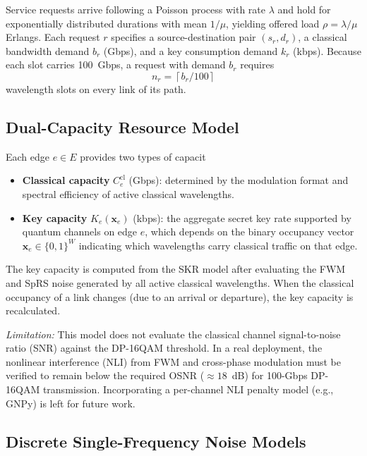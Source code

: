 \documentclass[conference]{IEEEtran}
\begin{document}
Service requests arrive following a Poisson process with rate $\lambda$ and hold for exponentially distributed durations with mean $1/\mu$, yielding offered load $\rho = \lambda / \mu$ Erlangs. Each request $r$ specifies a source-destination pair $(s_r, d_r)$, a classical bandwidth demand $b_r$ (Gbps), and a key consumption demand $k_r$ (kbps). Because each slot carries 100~Gbps, a request with demand $b_r$ requires
\begin{equation}
n_r = \left\lceil b_r / 100 \right\rceil
\label{eq:nslots}
\end{equation}
wavelength slots on every link of its path.

\subsection{Dual-Capacity Resource Model}

Each edge $e \in E$ provides two types of capacit\begin{itemize}
    \item \textbf{Classical capacity} $C_e^{\text{cl}}$ (Gbps): determined by the modulation format and spectral efficiency of active classical wavelengths.
    \item \textbf{Key capacity} $K_e(\mathbf{x}_e)$ (kbps): the aggregate secret key rate supported by quantum channels on edge $e$, which depends on the binary occupancy vector $\mathbf{x}_e \in \{0,1\}^W$ indicating which wavelengths carry classical traffic on that edge.
\end{itemize}

The key capacity is computed from the SKR model after evaluating the FWM and SpRS noise generated by all active classical wavelengths. When the classical occupancy of a link changes (due to an arrival or departure), the key capacity is recalculated.

\emph{Limitation:} This model does not evaluate the classical channel signal-to-noise ratio (SNR) against the DP-16QAM threshold. In a real deployment, the nonlinear interference (NLI) from FWM and cross-phase modulation must be verified to remain below the required OSNR ($\approx 18$~dB) for 100-Gbps DP-16QAM transmission. Incorporating a per-channel NLI penalty model (e.g., GNPy) is left for future work.

\subsection{Discrete Single-Frequency Noise Models}
\end{document}
